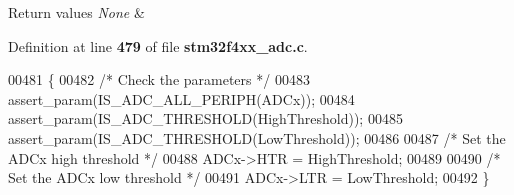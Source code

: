 \begin{DoxyRetVals}{Return values}
{\em None} & \\
\hline
\end{DoxyRetVals}


Definition at line \textbf{ 479} of file \textbf{ stm32f4xx\+\_\+adc.\+c}.


\begin{DoxyCode}
00481 \{
00482   \textcolor{comment}{/* Check the parameters */}
00483   assert_param(IS_ADC_ALL_PERIPH(ADCx));
00484   assert_param(IS_ADC_THRESHOLD(HighThreshold));
00485   assert_param(IS_ADC_THRESHOLD(LowThreshold));
00486   
00487   \textcolor{comment}{/* Set the ADCx high threshold */}
00488   ADCx->HTR = HighThreshold;
00489   
00490   \textcolor{comment}{/* Set the ADCx low threshold */}
00491   ADCx->LTR = LowThreshold;
00492 \}
\end{DoxyCode}
